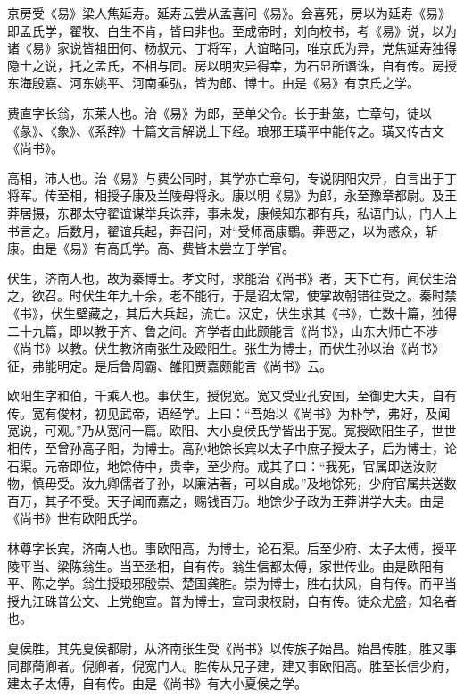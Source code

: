 \documentclass[12pt,UTF8]{ctexbook}
\begin{document}
京房受《易》梁人焦延寿。延寿云尝从孟喜问《易》。会喜死，房以为延寿《易》即孟氏学，翟牧、白生不肯，皆曰非也。至成帝时，刘向校书，考《易》说，以为诸《易》家说皆祖田何、杨叔元、丁将军，大谊略同，唯京氏为异，党焦延寿独得隐士之说，托之孟氏，不相与同。房以明灾异得幸，为石显所谮诛，自有传。房授东海殷嘉、河东姚平、河南乘弘，皆为郎、博士。由是《易》有京氏之学。



费直字长翁，东莱人也。治《易》为郎，至单父令。长于卦筮，亡章句，徒以《彖》、《象》、《系辞》十篇文言解说上下经。琅邪王璜平中能传之。璜又传古文《尚书》。



高相，沛人也。治《易》与费公同时，其学亦亡章句，专说阴阳灾异，自言出于丁将军。传至相，相授子康及兰陵母将永。康以明《易》为郎，永至豫章都尉。及王莽居摄，东郡太守翟谊谋举兵诛莽，事未发，康候知东郡有兵，私语门认，门人上书言之。后数月，翟谊兵起，莽召问，对“受师高康鸀。莽恶之，以为惑众，斩康。由是《易》有高氏学。高、费皆未尝立于学官。



伏生，济南人也，故为秦博士。孝文时，求能治《尚书》者，天下亡有，闻伏生治之，欲召。时伏生年九十余，老不能行，于是诏太常，使掌故朝错往受之。秦时禁《书》，伏生壁藏之，其后大兵起，流亡。汉定，伏生求其《书》，亡数十篇，独得二十九篇，即以教于齐、鲁之间。齐学者由此颇能言《尚书》，山东大师亡不涉《尚书》以教。伏生教济南张生及殴阳生。张生为博士，而伏生孙以治《尚书》征，弗能明定。是后鲁周霸、雒阳贾嘉颇能言《尚书》云。



欧阳生字和伯，千乘人也。事伏生，授倪宽。宽又受业孔安国，至御史大夫，自有传。宽有俊材，初见武帝，语经学。上曰：“吾始以《尚书》为朴学，弗好，及闻宽说，可观。”乃从宽问一篇。欧阳、大小夏侯氏学皆出于宽。宽授欧阳生子，世世相传，至曾孙高子阳，为博士。高孙地馀长宾以太子中庶子授太子，后为博士，论石渠。元帝即位，地馀侍中，贵幸，至少府。戒其子曰：“我死，官属即送汝财物，慎毋受。汝九卿儒者子孙，以廉洁著，可以自成。”及地馀死，少府官属共送数百万，其子不受。天子闻而嘉之，赐钱百万。地馀少子政为王莽讲学大夫。由是《尚书》世有欧阳氏学。



林尊字长宾，济南人也。事欧阳高，为博士，论石渠。后至少府、太子太傅，授平陵平当、梁陈翁生。当至丞相，自有传。翁生信都太傅，家世传业。由是欧阳有平、陈之学。翁生授琅邪殷崇、楚国龚胜。崇为博士，胜右扶风，自有传。而平当授九江硃普公文、上党鲍宣。普为博士，宣司隶校尉，自有传。徒众尤盛，知名者也。



夏侯胜，其先夏侯都尉，从济南张生受《尚书》以传族子始昌。始昌传胜，胜又事同郡蕳卿者。倪卿者，倪宽门人。胜传从兄子建，建又事欧阳高。胜至长信少府，建太子太傅，自有传。由是《尚书》有大小夏侯之学。
\end{document}
